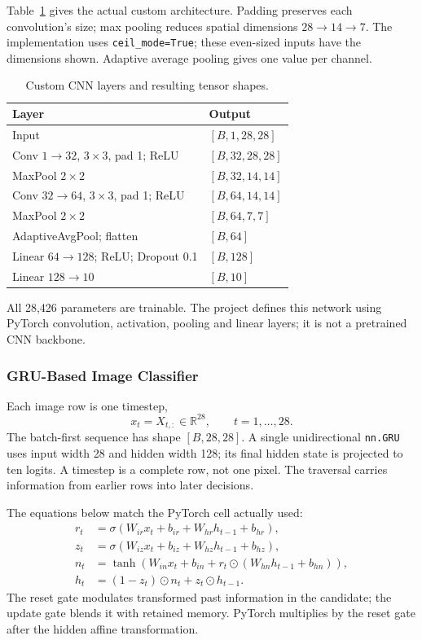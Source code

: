 Table~\ref{tab:cnn} gives the actual custom architecture. Padding preserves each
convolution's size; max pooling reduces spatial dimensions \(28\to14\to7\).
The implementation uses \texttt{ceil\_mode=True}; these even-sized inputs have
the dimensions shown. Adaptive average pooling gives one value per channel.
\begin{table}[H]\centering\small
\caption{Custom CNN layers and resulting tensor shapes.}
\label{tab:cnn}
\begin{tabular}{ll}
\toprule Layer & Output\\\midrule
Input & \([B,1,28,28]\)\\
Conv \(1\to32\), \(3\times3\), pad 1; ReLU & \([B,32,28,28]\)\\
MaxPool \(2\times2\) & \([B,32,14,14]\)\\
Conv \(32\to64\), \(3\times3\), pad 1; ReLU & \([B,64,14,14]\)\\
MaxPool \(2\times2\) & \([B,64,7,7]\)\\
AdaptiveAvgPool; flatten & \([B,64]\)\\
Linear \(64\to128\); ReLU; Dropout 0.1 & \([B,128]\)\\
Linear \(128\to10\) & \([B,10]\)\\\bottomrule
\end{tabular}
\end{table}
All 28,426 parameters are trainable. The project defines this network using
PyTorch convolution, activation, pooling and linear layers; it is not a pretrained
CNN backbone.

\subsubsection{GRU-Based Image Classifier}
Each image row is one timestep,
\[
 x_t=X_{t,:}\in\mathbb{R}^{28},\qquad t=1,\ldots,28.
\]
The batch-first sequence has shape \([B,28,28]\). A single unidirectional
\texttt{nn.GRU} uses input width 28 and hidden width 128; its final hidden
state is projected to ten logits. A timestep is a complete row, not one pixel.
The traversal carries information from earlier rows into later decisions.

The equations below match the PyTorch cell actually used:\citep{pytorchgru}
\begin{align*}
 r_t&=\sigma(W_{ir}x_t+b_{ir}+W_{hr}h_{t-1}+b_{hr}),\\
 z_t&=\sigma(W_{iz}x_t+b_{iz}+W_{hz}h_{t-1}+b_{hz}),\\
 n_t&=\tanh(W_{in}x_t+b_{in}+r_t\odot(W_{hn}h_{t-1}+b_{hn})),\\
 h_t&=(1-z_t)\odot n_t+z_t\odot h_{t-1}.
\end{align*}
The reset gate modulates transformed past information in the candidate; the update
gate blends it with retained memory. PyTorch multiplies by the reset gate after
the hidden affine transformation.

